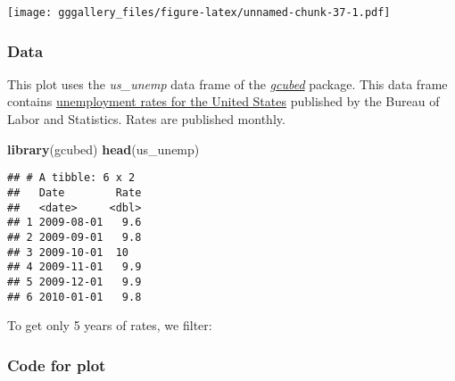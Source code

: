 \documentclass[]{book}
\newenvironment{Shaded}{\begin{snugshade}}{\end{snugshade}}
\newcommand{\KeywordTok}[1]{\textcolor[rgb]{0.13,0.29,0.53}{\textbf{#1}}}
\newcommand{\NormalTok}[1]{#1}
\newcommand{\OperatorTok}[1]{\textcolor[rgb]{0.81,0.36,0.00}{\textbf{#1}}}
\newcommand{\StringTok}[1]{\textcolor[rgb]{0.31,0.60,0.02}{#1}}
\begin{document}
\texttt{[image: gggallery\_files/figure-latex/unnamed-chunk-37-1.pdf]}

\hypertarget{unempppdata}{%
\subsubsection*{Data}\label{unempppdata}}

This plot uses the \emph{us\_unemp} data frame of the \protect\hyperlink{gcubed}{\emph{gcubed}} package. This data frame contains \href{https://data.bls.gov/timeseries/LNS14000000}{unemployment rates for the United States} published by the Bureau of Labor and Statistics. Rates are published monthly.

\begin{Shaded}
\begin{Highlighting}[]
\KeywordTok{library}\NormalTok{(gcubed)}
\KeywordTok{head}\NormalTok{(us_unemp)}
\end{Highlighting}
\end{Shaded}

\begin{verbatim}
## # A tibble: 6 x 2
##   Date        Rate
##   <date>     <dbl>
## 1 2009-08-01   9.6
## 2 2009-09-01   9.8
## 3 2009-10-01  10  
## 4 2009-11-01   9.9
## 5 2009-12-01   9.9
## 6 2010-01-01   9.8
\end{verbatim}

To get only 5 years of rates, we filter:

\begin{Shaded}
\end{Shaded}

\hypertarget{unempppcode}{%
\subsubsection*{Code for plot}\label{unempppcode}}
\end{document}
